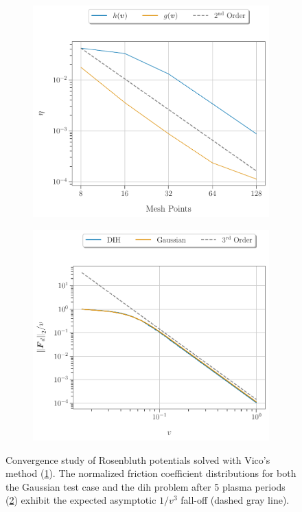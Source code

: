 \begin{figure}[h]
  \begin{subfigure}[b]{0.52\textwidth}
    \includegraphics[width=\textwidth]{figures/results/convergenceStudy/hg_005vmax_VICO.pdf}
    \caption{}
    \label{fig:convergence_hg_VICO}
  \end{subfigure}
  \hfill
  \begin{subfigure}[b]{0.52\textwidth}
    \includegraphics[width=\textwidth]{figures/results/Fd_asymptotic.pdf}
    \caption{}
    \label{fig:asymptoticFd}
  \end{subfigure}
  \caption{Convergence study of Rosenbluth potentials  solved with Vico's method (\ref{fig:convergence_hg_VICO}).
      The normalized friction coefficient distributions for both the Gaussian test case and the
      \gls{dih} problem after 
  5 plasma periods (\ref{fig:asymptoticFd}) exhibit the expected asymptotic $1/v^3$ fall-off (dashed gray line).}
\label{fig:convergence_VICO}
\end{figure}

